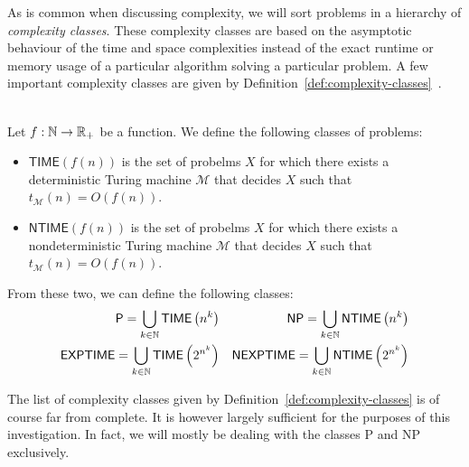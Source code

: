     As is common when discussing complexity, we will sort problems in a hierarchy of \emph{complexity classes}. These complexity classes are based on the asymptotic behaviour of the time and space complexities instead of the exact runtime or memory usage of a particular algorithm solving a particular problem. A few important complexity classes are given by Definition~\ref{def:complexity-classes}~\cite{langages-formels}.

    \begin{definition}\ \\
        \label{def:complexity-classes}
        Let \(f: \mathbb{N} \rightarrow \mathbb{R}_+\) be a function. We define the following classes of problems:
        \begin{itemize}
            \item \(\textsf{TIME}(f(n))\) is the set of probelms \(X\) for which there exists a deterministic Turing machine \(\mathcal{M}\) that decides \(X\) such that \(t_{\mathcal{M}}(n) = O(f(n))\).
            \item 
            \(\textsf{NTIME}(f(n))\) is the set of probelms \(X\) for which there exists a nondeterministic Turing machine \(\mathcal{M}\) that decides \(X\) such that \(t_{\mathcal{M}}(n) = O(f(n))\).    
        \end{itemize}
        From these two, we can define the following classes:
        \begin{align*}
            \textsf{P} = \bigcup\limits_{k\in\mathbb{N}} \textsf{TIME}\left(n^k\right)& &
            \textsf{NP} = \bigcup\limits_{k\in\mathbb{N}} \textsf{NTIME}\left(n^k\right) \\
            \textsf{EXPTIME} = \bigcup\limits_{k\in\mathbb{N}} \textsf{TIME}\left(2^{n^k}\right) & &
            \textsf{NEXPTIME} = \bigcup\limits_{k\in\mathbb{N}} \textsf{NTIME}\left(2^{n^k}\right) \\
        \end{align*}
    \end{definition}

    The list of complexity classes given by Definition~\ref{def:complexity-classes} is of course far from complete. It is however largely sufficient for the purposes of this investigation. In fact, we will mostly be dealing with the classes \textsf{P} and \textsf{NP} exclusively.

    



